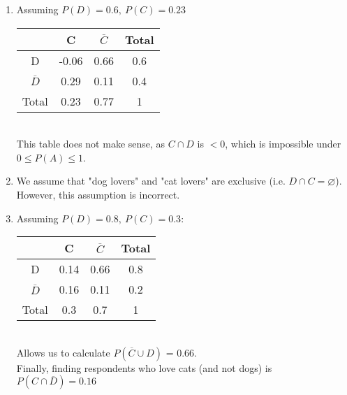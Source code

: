 \documentclass{article}
\begin{document}
\begin{enumerate}[label=\alph*)]
    \item Assuming \(P(D) = 0.6,\ P(C) = 0.23\) \\
    \begin{tabular}{|c|c|c|c|}
        \hline
        & C & \(\overline{C}\) & Total \\
        \hline
        D & -0.06 & 0.66 & 0.6 \\
        \hline
        \(\overline{D}\) & 0.29 & 0.11 & 0.4 \\
        \hline
        Total & 0.23 & 0.77 & 1 \\
        \hline
    \end{tabular} \\
    This table does not make sense, as \(C \cap D\) is \(< 0\), which is impossible under \(0 \le P(A) \le 1\).
    \item We assume that "dog lovers" and "cat lovers" are exclusive (i.e. \(D \cap C = \varnothing\)). \\
    However, this assumption is incorrect.
    \item  Assuming \(P(D) = 0.8,\ P(C) = 0.3\):\\
    \begin{tabular}{|c|c|c|c|}
        \hline
        & C & \(\overline{C}\) & Total \\
        \hline
        D & 0.14 & 0.66 & 0.8 \\
        \hline
        \(\overline{D}\) & 0.16 & 0.11 & 0.2 \\
        \hline
        Total & 0.3 & 0.7 & 1 \\
        \hline
    \end{tabular} \\
    Allows us to calculate \(P(\overline{C} \cup D)\) = 0.66. \\
    Finally, finding respondents who love cats (and not dogs) is \(P(C \cap \overline{D}) = 0.16\)
\end{enumerate}

\pagebreak
\end{document}
